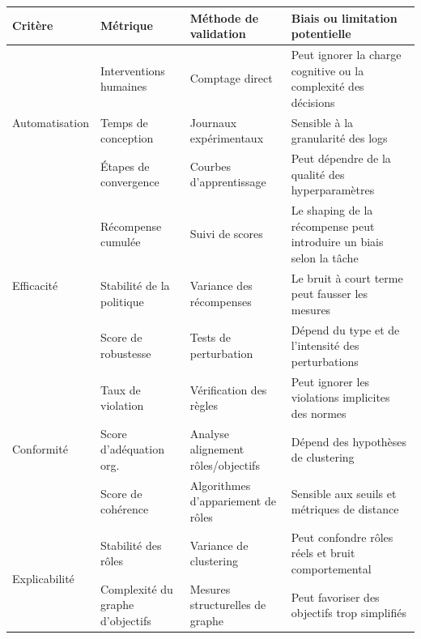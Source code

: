 \begin{table}[h!]
    \centering
    \renewcommand{\arraystretch}{1.3}
    \begin{footnotesize}
        \begin{tabular}{p{1.5cm}p{2.4cm}p{2.2cm}p{4.5cm}}
            \hline
            \textbf{Critère} & \textbf{Métrique}       & \textbf{Méthode de validation}   & \textbf{Biais ou limitation potentielle}            \\
            \hline
            \multirow{3}{*}{Automatisation}
                               & Interventions humaines   & Comptage direct              & Peut ignorer la charge cognitive ou la complexité des décisions \\
                               & Temps de conception      & Journaux expérimentaux       & Sensible à la granularité des logs                \\
                               & Étapes de convergence    & Courbes d'apprentissage      & Peut dépendre de la qualité des hyperparamètres   \\
            \hline
            \multirow{3}{*}{Efficacité}
                               & Récompense cumulée       & Suivi de scores              & Le shaping de la récompense peut introduire un biais selon la tâche \\
                               & Stabilité de la politique & Variance des récompenses     & Le bruit à court terme peut fausser les mesures  \\
                               & Score de robustesse      & Tests de perturbation        & Dépend du type et de l'intensité des perturbations \\
            \hline
            \multirow{3}{*}{Conformité}
                               & Taux de violation        & Vérification des règles      & Peut ignorer les violations implicites des normes \\
                               & Score d'adéquation org.  & Analyse alignement rôles/objectifs & Dépend des hypothèses de clustering \\
                               & Score de cohérence       & Algorithmes d'appariement de rôles & Sensible aux seuils et métriques de distance \\
            \hline
            \multirow{3}{*}{Explicabilité}
                               & Stabilité des rôles      & Variance de clustering       & Peut confondre rôles réels et bruit comportemental \\
                               & Complexité du graphe d'objectifs & Mesures structurelles de graphe & Peut favoriser des objectifs trop simplifiés \\

\end{tabular}
\end{footnotesize}
\end{table}
